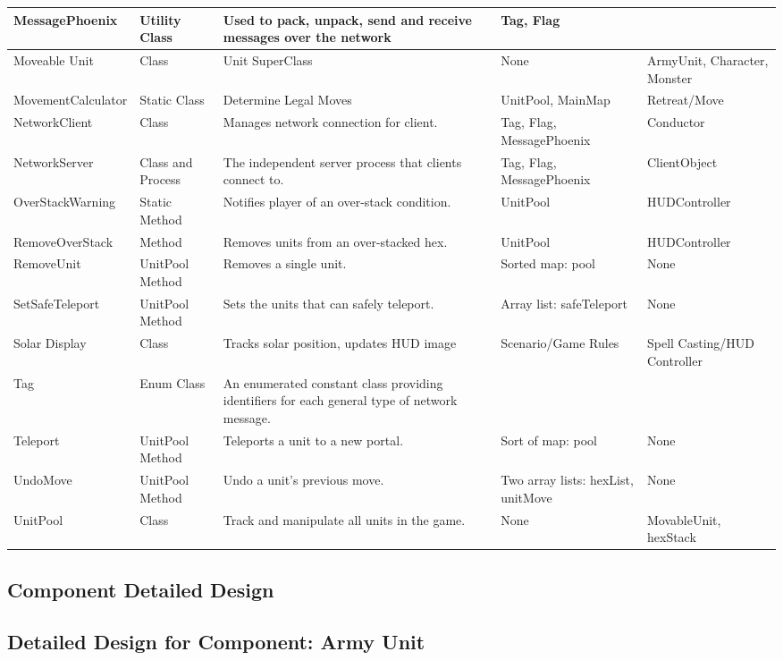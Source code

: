\documentclass[12pt,a4paper,titlepage]{article}
\begin{document}
{\begin{center}
\begin{tabularx}{\linewidth}{|p{1.5in}|X|X|X|X|}
\hline
MessagePhoenix & Utility Class & Used to pack, unpack, send and receive messages over the network & Tag, Flag & \\
\hline
Moveable Unit & Class & Unit SuperClass & None & ArmyUnit, Character, Monster\\
\hline
MovementCalculator & Static Class & Determine Legal Moves & UnitPool, MainMap & Retreat/Move\\
\hline
NetworkClient & Class & Manages network connection for client. & Tag, Flag, MessagePhoenix & Conductor \\
\hline
NetworkServer & Class and Process & The independent server process that clients connect to. & Tag, Flag, MessagePhoenix & ClientObject\\
\hline
OverStackWarning & Static Method & Notifies player of an over-stack condition. & UnitPool & HUDController\\
\hline
RemoveOverStack & Method & Removes units from an over-stacked hex. & UnitPool & HUDController\\
\hline
RemoveUnit & UnitPool Method & Removes a single unit. & Sorted map: pool & None\\
\hline
SetSafeTeleport & UnitPool Method & Sets the units that can safely teleport. & Array list: safeTeleport & None\\
\hline
Solar Display & Class & Tracks solar position, updates HUD image & Scenario/Game Rules & Spell Casting/HUD Controller\\
\hline
Tag & Enum Class & An enumerated constant class providing identifiers for each general type of network message. & & \\
\hline
Teleport & UnitPool Method & Teleports a unit to a new portal. & Sort of map: pool & None\\
\hline 
UndoMove & UnitPool Method & Undo a unit's previous move. & Two array lists: hexList, unitMove & None\\
\hline
UnitPool & Class & Track and manipulate all units in the game. & None & MovableUnit, hexStack\\
\hline
\end{tabularx}
\end{center}
}

\subsection{Component Detailed Design}
\subsection{Detailed Design for Component: Army Unit}
\end{document}
